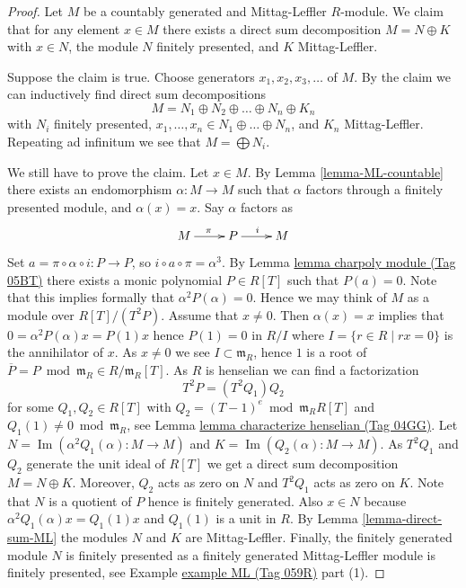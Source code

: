 \documentclass{amsart}
\theoremstyle{plain}
\theoremstyle{definition}
\theoremstyle{remark}
\numberwithin{equation}{subsection}
\def\Im{\mathop{\mathrm{Im}}}
\begin{document}
\begin{proof}
Let $M$ be a countably generated and Mittag-Leffler $R$-module.
We claim that for any element $x \in M$ there exists a direct
sum decomposition $M = N \oplus K$ with $x \in N$, the module
$N$ finitely presented, and $K$ Mittag-Leffler.

\medskip\noindent
Suppose the claim is true. Choose generators $x_1, x_2, x_3, \ldots$
of $M$. By the claim we can inductively find direct sum decompositions
$$
M = N_1 \oplus N_2 \oplus \ldots \oplus N_n \oplus K_n
$$
with $N_i$ finitely presented,
$x_1, \ldots, x_n \in N_1 \oplus \ldots \oplus N_n$, and $K_n$ Mittag-Leffler.
Repeating ad infinitum we see that $M = \bigoplus N_i$.

\medskip\noindent
We still have to prove the claim. Let $x \in M$. By
Lemma \ref{lemma-ML-countable}
there exists an endomorphism $\alpha : M \to M$
such that $\alpha$ factors through a finitely presented module, and
$\alpha (x) = x$. Say $\alpha$ factors as
$$
\xymatrix{
M \ar[r]^\pi & P \ar[r]^i & M
}
$$
Set $a = \pi \circ \alpha \circ i : P \to P$, so
$i \circ a \circ \pi = \alpha^3$. By
Lemma \href{https://stacks.math.columbia.edu/tag/05BT}{lemma charpoly module (Tag 05BT)}
there exists a monic polynomial $P \in R[T]$ such that $P(a) = 0$.
Note that this implies formally that $\alpha^2 P(\alpha) = 0$.
Hence we may think of $M$ as a module over $R[T]/(T^2P)$.
Assume that $x \not = 0$. Then $\alpha(x) = x$ implies that
$0 = \alpha^2P(\alpha)x = P(1)x$ hence $P(1) = 0$ in $R/I$ where
$I = \{r \in R \mid rx = 0\}$ is the annihilator of $x$.
As $x \not = 0$ we see $I \subset \mathfrak m_R$, hence
$1$ is a root of $\overline{P} = P \bmod \mathfrak m_R \in R/\mathfrak m_R[T]$.
As $R$ is henselian we can find a factorization
$$
T^2P = (T^2 Q_1) Q_2
$$
for some $Q_1, Q_2 \in R[T]$ with
$Q_2 = (T - 1)^e \bmod \mathfrak m_R R[T]$ and
$Q_1(1) \not = 0 \bmod \mathfrak m_R$, see
Lemma \href{https://stacks.math.columbia.edu/tag/04GG}{lemma characterize henselian (Tag 04GG)}.
Let $N = \Im(\alpha^2Q_1(\alpha) : M \to M)$ and
$K = \Im(Q_2(\alpha) : M \to M)$. As $T^2Q_1$ and
$Q_2$ generate the unit ideal of $R[T]$ we get a direct sum
decomposition $M = N \oplus K$. Moreover, $Q_2$ acts as zero on $N$ and
$T^2Q_1$ acts as zero on $K$. Note that $N$ is a quotient of $P$
hence is finitely generated. Also $x \in N$ because
$\alpha^2Q_1(\alpha)x = Q_1(1)x$ and $Q_1(1)$ is a unit in $R$. By
Lemma \ref{lemma-direct-sum-ML}
the modules $N$ and $K$ are Mittag-Leffler. Finally, the finitely generated
module $N$ is finitely presented as a finitely generated Mittag-Leffler
module is finitely presented, see
Example \href{https://stacks.math.columbia.edu/tag/059R}{example ML (Tag 059R)} part (1).
\end{proof}
\end{document}
